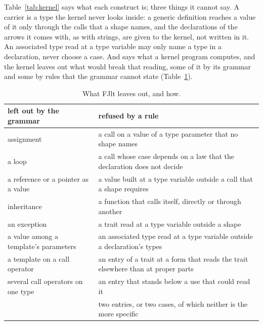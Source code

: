 
Table~\ref{tab:kernel} says what each construct is; three things it cannot say.
A carrier is a type the kernel never looks inside: a generic definition reaches a value of it only through the calls that a shape names, and the declarations of the arrows it comes with, as  with strings, are given to the kernel, not written in it.
An associated type read at a type variable may only name a type in a declaration, never choose a case.
And \Cpp{} says what a kernel program computes, and the kernel leaves out what would break that reading, some of it by its grammar and some by rules that the grammar cannot state (Table~\ref{tab:excluded}).

\begin{table}[tb]
\centering
\small
\begin{tabularx}{\linewidth}{@{}>{\raggedright\arraybackslash}X>{\raggedright\arraybackslash}X@{}}
\toprule
left out by the grammar & refused by a rule \\
\midrule
assignment & a call on a value of a type parameter that no shape names \\
a loop & a call whose case depends on a law that the declaration does not decide \\
a reference or a pointer as a value & a value built at a type variable outside a call that a shape requires \\
inheritance & a function that calls itself, directly or through another \\
an exception & a trait read at a type variable outside a shape \\
a value among a template's parameters & an associated type read at a type variable outside a declaration's types \\
a template on a call operator & an entry of a trait at a form that reads the trait elsewhere than at proper parts \\
several call operators on one type & an entry that stands below a use that could read it \\
& two entries, or two cases, of which neither is the more specific \\
\bottomrule
\end{tabularx}
\caption{What FJlt leaves out, and how.}
\label{tab:excluded}
\end{table}

